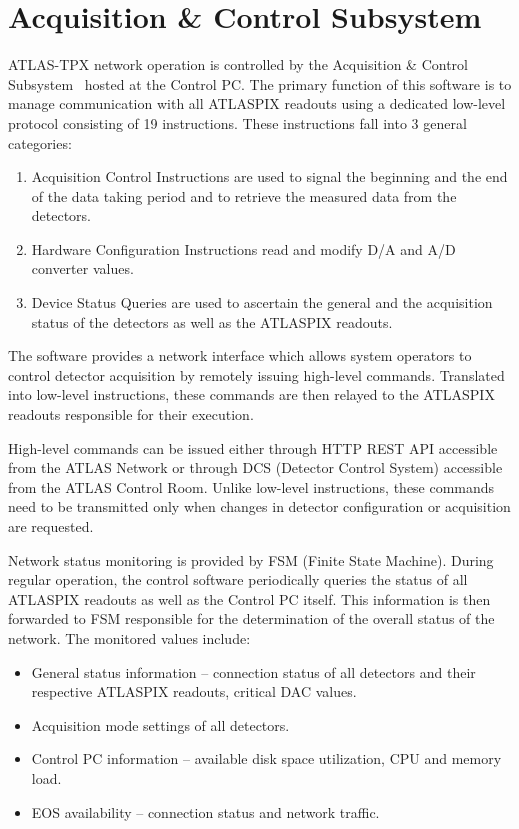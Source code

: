 \documentclass[journal]{IEEEtran}
\begin{document}
\section{\label{sec:acquisition}Acquisition \& Control Subsystem}
ATLAS-TPX network operation is controlled by the Acquisition \& Control Subsystem~\cite{Begera2016} hosted at the Control PC. The primary function of this software is to manage communication with all ATLASPIX readouts using a dedicated low-level protocol consisting of 19 instructions. These instructions fall into 3 general categories:
~
\begin{enumerate}
  \item Acquisition Control Instructions are used to signal the beginning and the end of the data taking period and to retrieve the measured data from the detectors.
  \item Hardware Configuration Instructions read and modify D/A and A/D converter values.
  \item Device Status Queries are used to ascertain the general and the acquisition status of the detectors as well as the ATLASPIX readouts.
\end{enumerate}

The software provides a network interface which allows system operators to control detector acquisition by remotely issuing high-level commands. Translated into low-level instructions, these commands are then relayed to the ATLASPIX readouts responsible for their execution.

High-level commands can be issued either through HTTP REST API accessible from the ATLAS Network or through DCS (Detector Control System) accessible from the ATLAS Control Room. Unlike low-level instructions, these commands need to be transmitted only when changes in detector configuration or acquisition are requested.

Network status monitoring is provided by FSM (Finite State Machine). During regular operation, the control software periodically queries the status of all ATLASPIX readouts as well as the Control PC itself. This information is then forwarded to FSM responsible for the determination of the overall status of the network. The monitored values include:
~
\begin{itemize}
  \item General status information -- connection status of all detectors and their respective ATLASPIX readouts, critical DAC values.
  \item Acquisition mode settings of all detectors.
  \item Control PC information -- available disk space utilization, CPU and memory load.
  \item EOS availability -- connection status and network traffic.
\end{itemize}
\end{document}
